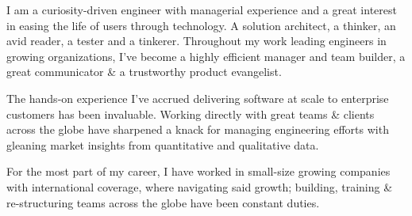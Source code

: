 I am a curiosity-driven engineer with managerial experience and a great interest in easing the life of users through technology. A solution architect, a thinker, an avid reader, a tester and a tinkerer. Throughout my work leading engineers in growing organizations, I've become a highly efficient manager and team builder, a great communicator \& a trustworthy product evangelist.

The hands-on experience I've accrued delivering software at scale to enterprise customers has been invaluable. Working directly with great teams \& clients across the globe have sharpened a knack for managing engineering efforts with gleaning market insights from quantitative and qualitative data.

For the most part of my career, I have worked in small-size growing companies with international coverage, where navigating said growth; building, training \& re-structuring teams across the globe have been constant duties.